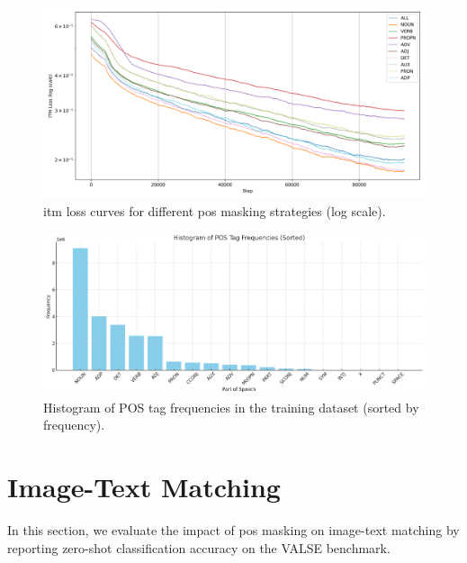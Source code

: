 \begin{figure}[h]
    \caption{\acrshort{itm} loss curves for different \acrshort{pos} masking strategies (log scale).}
    \label{fig:itm_loss_pretrain}
    \begin{center}
        \includegraphics[width=1\textwidth]{Images/graph/itm.png}
    \end{center}
\end{figure}

\begin{figure}[h]
    \caption{Histogram of POS tag frequencies in the training dataset (sorted by frequency).}
    \label{fig:pos_count}
    \begin{center}
        \includegraphics[width=1\textwidth]{Images/graph/pos_count.png}
    \end{center}
\end{figure}

\section{Image-Text Matching}
In this section, we evaluate the impact of \acrshort{pos} masking on image-text matching by reporting zero-shot classification accuracy on the VALSE benchmark.

